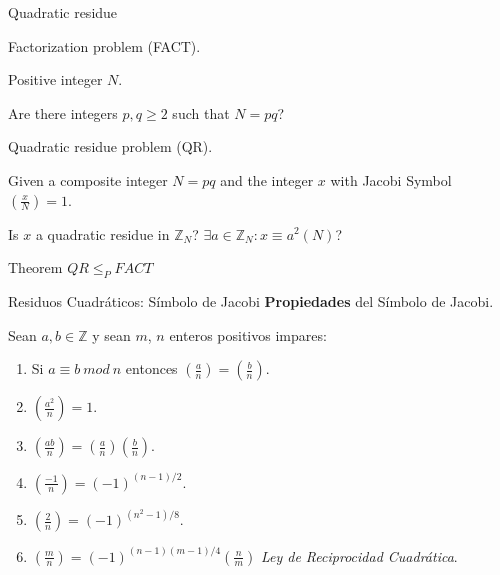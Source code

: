 \documentclass{beamer}
\begin{document}
\begin{frame}{Quadratic residue}
\begin{description}[Parameters]
\item[Name] Factorization problem (FACT).
\item[Parameters] Positive integer $N$.
\item[Question] Are there integers $p,q\geq 2$ such that $N = pq$?
\end{description}

\begin{description}[Parameters]
\item[Name] Quadratic residue problem (QR).
\item[Parameters] Given a composite integer $N=pq$ and the integer $x$ with Jacobi Symbol $\left( \frac{x}{N} \right) = 1$.
\item[Question] Is $x$ a quadratic residue in ${\mathbb Z}_N$? $\exists a\in {\mathbb Z}_N : x\equiv a^2 (N)$?
\end{description}

\begin{block}{Theorem}
$QR \leq_P FACT$
\end{block}

\end{frame}


















\begin{frame}{Residuos Cuadráticos: Símbolo de Jacobi}
\textbf{Propiedades} del S\'imbolo de Jacobi.

Sean $a,b \in {\mathbb Z}$ y sean $m$, $n$ enteros positivos impares:
\begin{enumerate}
	\item Si $a\equiv b~mod~n$ entonces $\left( \frac{a}{n} \right) = \left( \frac{b}{n} \right)$.
	\item $\left( \frac{a^2}{n} \right) = 1$.
	\item $\left( \frac{ab}{n} \right) = \left( \frac{a}{n} \right)\left( \frac{b}{n} \right)$.
	\item $\left( \frac{-1}{n} \right) = (-1)^{(n-1)/2}$.
	\item $\left( \frac{2}{n} \right) = (-1)^{(n^2-1)/8}$.
	\item $\left( \frac{m}{n} \right) = (-1)^{(n-1)(m-1)/4} \left( \frac{n}{m} \right)$ \textit{Ley de Reciprocidad Cuadr\'atica}.
\end{enumerate}
\end{frame}
\end{document}
